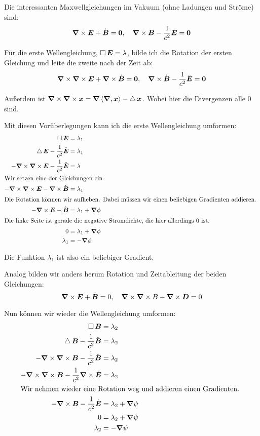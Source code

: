 Die interessanten Maxwellgleichungen im Vakuum (ohne Ladungen und Ströme) sind:
\[
	\boldsymbol{\nabla} \times \boldsymbol{E} + \dot{\boldsymbol{B}} = \boldsymbol{0}
	,\quad
	\boldsymbol{\nabla} \times \boldsymbol{B} - \frac{1}{c^2} \dot{\boldsymbol{E}} = \boldsymbol{0}
\]

Für die erste Wellengleichung, $\mathop{{}\Box}\nolimits \boldsymbol{E} = \lambda$, bilde ich die Rotation der ersten Gleichung und leite die zweite nach der Zeit ab:
\[
	\boldsymbol{\nabla} \times \boldsymbol{\nabla} \times \boldsymbol{E} + \boldsymbol{\nabla} \times \dot{\boldsymbol{B}} = \boldsymbol{0}
	,\quad
	\boldsymbol{\nabla} \times \dot{\boldsymbol{B}} - \frac{1}{c^2} \ddot{\boldsymbol{E}} = \boldsymbol{0}
\]

Außerdem ist $\boldsymbol{\nabla} \times \boldsymbol{\nabla} \times \boldsymbol{x} = \boldsymbol{\nabla} \left\langle \boldsymbol{\nabla}, \boldsymbol{x} \right\rangle - \mathop{{}\bigtriangleup}\nolimits \boldsymbol{x}$. Wobei hier die Divergenzen alle $0$ sind.

Mit diesen Vorüberlegungen kann ich die erste Wellengleichung umformen:
\begin{align*}
	\dalambert \vec E &= \lambda_1 \\
	\laplace \vec E - \frac{1}{c^2} \ddot{\vec E} &= \lambda_1 \\
	- \curl \curl \vec E - \frac{1}{c^2} \ddot{\vec E} &= \lambda \\
	\intertext{%
		Wir setzen eine der Gleichungen ein.
	}
	- \curl \curl \vec E - \curl \dot{\vec B} &= \lambda_1 \\
	\intertext{%
		Die Rotation können wir aufheben. Dabei müssen wir einen beliebigen
		Gradienten addieren.
	}
	- \curl \vec E - \dot{\vec B} &= \lambda_1 + \vnabla \phi \\
	\intertext{%
		Die linke Seite ist gerade die negative Stromdichte, die hier
		allerdings $0$ ist.
	}
	0 &= \lambda_1 + \vnabla \phi \\
	\lambda_1 &= - \vnabla \phi
\end{align*}

Die Funktion $\lambda_1$ ist also ein beliebiger Gradient.

Analog bilden wir anders herum Rotation und Zeitableitung der beiden Gleichungen:
\[
	\boldsymbol{\nabla} \times \dot{\boldsymbol{E}} + \ddot{\boldsymbol{B}} = 0
	,\quad
	\boldsymbol{\nabla} \times \boldsymbol{\nabla} \times B - \boldsymbol{\nabla} \times \dot{\boldsymbol{D}} = 0
\]

Nun können wir wieder die Wellengleichung umformen:
\begin{align*}
	\dalambert \vec B &= \lambda_2 \\
	\laplace \vec B - \frac{1}{c^2} \ddot{\vec B} &= \lambda_2 \\
- \curl \curl \vec B - \frac{1}{c^2} \ddot{\vec B} &= \lambda_2 \\
	   - \curl \curl \vec B - \frac{1}{c^2} \curl \dot{\vec E} &= \lambda_2 \\
	\intertext{%
		Wir nehmen wieder eine Rotation weg und addieren einen Gradienten.
	}
	   - \curl \vec B - \frac{1}{c^2} \dot{\vec E} &= \lambda_2 + \vnabla \psi \\
	   0 &= \lambda_2 + \vnabla \psi \\
	   \lambda_2 &= - \vnabla \psi
\end{align*}

